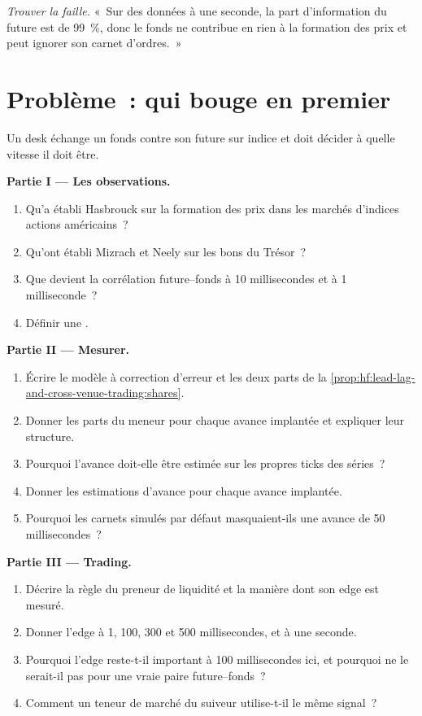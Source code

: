 \begin{exercise}[$\star\star\star$]\label{exo:hf:lead-lag-and-cross-venue-trading:8}
\emph{Trouver la faille.} «~Sur des données à une seconde, la part d'information du future est de 99~\%, donc le fonds ne contribue en rien à la formation des prix et
peut ignorer son carnet d'ordres.~»
\end{exercise}

\section{Problème~: qui bouge en premier}

\begin{problem}\label{pb:hf:lead-lag-and-cross-venue-trading:1}
Un desk échange un fonds contre son future sur indice et doit décider à quelle vitesse il doit être.

\medskip\noindent\textbf{Partie I --- Les observations.}
\begin{enumerate}
\item Qu'a établi Hasbrouck sur la formation des prix dans les marchés d'indices actions américains~?
\item Qu'ont établi Mizrach et Neely sur les bons du Trésor~?
\item Que devient la corrélation future--fonds à 10 millisecondes et à 1 milliseconde~?
\item Définir une .
\end{enumerate}

\medskip\noindent\textbf{Partie II --- Mesurer.}
\begin{enumerate}[resume]
\item Écrire le modèle à correction d'erreur et les deux parts de la \cref{prop:hf:lead-lag-and-cross-venue-trading:shares}.
\item Donner les parts du meneur pour chaque avance implantée et expliquer leur structure.
\item Pourquoi l'avance doit-elle être estimée sur les propres ticks des séries~?
\item Donner les estimations d'avance pour chaque avance implantée.
\item Pourquoi les carnets simulés par défaut masquaient-ils une avance de 50 millisecondes~?
\end{enumerate}

\medskip\noindent\textbf{Partie III --- Trading.}
\begin{enumerate}[resume]
\item Décrire la règle du preneur de liquidité et la manière dont son edge est mesuré.
\item Donner l'edge à 1, 100, 300 et 500 millisecondes, et à une seconde.
\item Pourquoi l'edge reste-t-il important à 100 millisecondes ici, et pourquoi ne le serait-il pas pour une vraie paire future--fonds~?
\item Comment un teneur de marché du suiveur utilise-t-il le même signal~?
\end{enumerate}


\end{problem}
